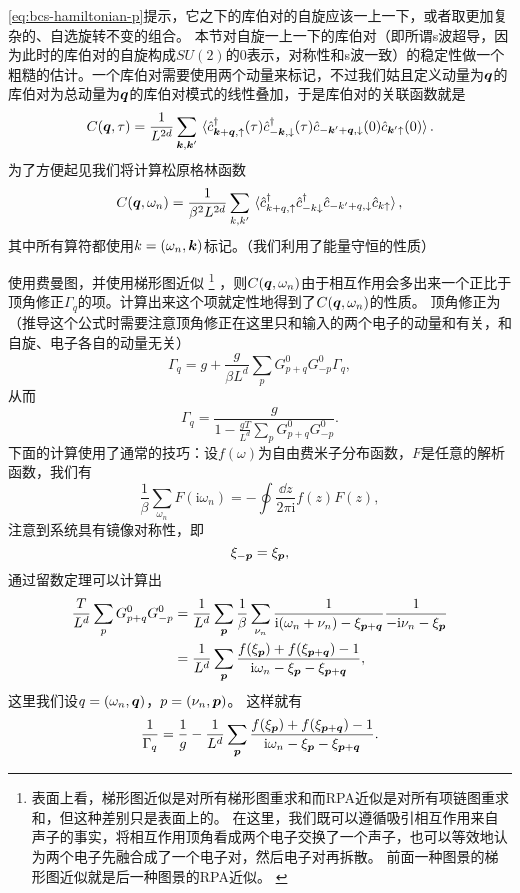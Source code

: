 \documentclass[hyperref, UTF8, a4paper]{ctexart}
\newcommand*{\ii}{\mathrm{i}}
\begin{document}
\eqref{eq:bcs-hamiltonian-p}提示，它之下的库伯对的自旋应该一上一下，或者取更加复杂的、自选旋转不变的组合。
本节对自旋一上一下的库伯对（即所谓s波超导，因为此时的库伯对的自旋构成$SU(2)$的$0$表示，对称性和s波一致）的稳定性做一个粗糙的估计。一个库伯对需要使用两个动量来标记，不过我们姑且定义动量为$\vb*{q}$的库伯对为总动量为$\vb*{q}$的库伯对模式的线性叠加，于是库伯对的关联函数就是
\begin{equation}
    C(\vb*{q}, \tau) = \frac{1}{L^{2d}} \sum_{\vb*{k}, \vb*{k}'} \expval*{\hat{c}^\dagger_{\vb*{k}+\vb*{q}, \uparrow}(\tau) \hat{c}^\dagger_{-\vb*{k}, \downarrow}(\tau) \hat{c}_{-\vb*{k}'+\vb*{q}, \downarrow}(0) \hat{c}_{\vb*{k}' \uparrow}(0)}.
\end{equation}
为了方便起见我们将计算松原格林函数
\[
    C(\vb*{q}, \omega_n) = \frac{1}{\beta^2 L^{2d}} \sum_{k, k'} \expval*{\hat{c}^\dagger_{k+q, \uparrow} \hat{c}^\dagger_{-k \downarrow} \hat{c}_{-k'+q, \downarrow} \hat{c}_{k \uparrow}},
\]
其中所有算符都使用$k=(\omega_n, \vb*{k})$标记。（我们利用了能量守恒的性质）

使用费曼图，并使用梯形图近似%
\footnote{
    表面上看，梯形图近似是对所有梯形图重求和而RPA近似是对所有项链图重求和，但这种差别只是表面上的。
    在这里，我们既可以遵循吸引相互作用来自声子的事实，将相互作用顶角看成两个电子交换了一个声子，也可以等效地认为两个电子先融合成了一个电子对，然后电子对再拆散。
    前面一种图景的梯形图近似就是后一种图景的RPA近似。
    \label{note:rpa-graph}
}%
，则$C(\vb*{q}, \omega_n)$由于相互作用会多出来一个正比于顶角修正$\Gamma_{q}$的项。计算出来这个项就定性地得到了$C(\vb*{q}, \omega_n)$的性质。
顶角修正为（推导这个公式时需要注意顶角修正在这里只和输入的两个电子的动量和有关，和自旋、电子各自的动量无关）
\[
    \Gamma_{q} = g + \frac{g}{\beta L^d} \sum_{p} G^0_{p + q} G^0_{- p} \Gamma_{q},
\]
从而
\[
    \Gamma_{q} = \frac{g}{1 - \frac{g T}{L^d} \sum_{p} G^0_{p+q} G^0_{-p}}.
\]
下面的计算使用了通常的技巧：设$f(\omega)$为自由费米子分布函数，$F$是任意的解析函数，我们有
\[
    \frac{1}{\beta} \sum_{\omega_n} F(\ii \omega_n) = - \oint \frac{\dd{z}}{2\pi \ii} f(z) F(z),
\]
注意到系统具有镜像对称性，即
\[
    \xi_{-\vb*{p}} = \xi_{\vb*{p}},
\]
通过留数定理可以计算出
\[
    \begin{aligned}
        \frac{T}{L^d} \sum_{p} G^0_{p+q} G^0_{-p} &= \frac{1}{L^d} \sum_{\vb*{p}} \frac{1}{\beta} \sum_{\nu_n} \frac{1}{\ii (\omega_n + \nu_n) - \xi_{\vb*{p}+\vb*{q}}} \frac{1}{- \ii \nu_n - \xi_{\vb*{p}}} \\
        &= \frac{1}{L^d} \sum_{\vb*{p}} \frac{f(\xi_{\vb*{p}}) + f(\xi_{\vb*{p}+\vb*{q}}) - 1}{\ii \omega_n - \xi_{\vb*{p}} - \xi_{\vb*{p}+\vb*{q}}}, 
    \end{aligned}
\]
这里我们设$q=(\omega_n, \vb*{q})$，$p=(\nu_n, \vb*{p})$。
这样就有
\begin{equation}
    \frac{1}{\Gamma_q} = \frac{1}{g} - \frac{1}{L^d} \sum_{\vb*{p}} \frac{f(\xi_{\vb*{p}}) + f(\xi_{\vb*{p}+\vb*{q}}) - 1}{\ii \omega_n - \xi_{\vb*{p}} - \xi_{\vb*{p}+\vb*{q}}}.
    \label{eq:bcs-rpa-correction}
\end{equation}
\end{document}
